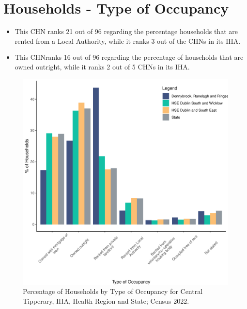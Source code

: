 \documentclass{article}
\begin{document}
\section{Households - Type of Occupancy}\label{sect:Households}
\begin{itemize}
\item This CHN ranks  21 out of 96 regarding the percentage households that are rented from a Local Authority, while it ranks  3 out of the CHNs in its IHA. 
\item This CHNranks  16 out of 96 regarding the percentage of households that are owned outright, while it ranks   2 out of 5 CHNs in its IHA.
\end{itemize}
\begin{figure}[H]
	\centering
	\includegraphics[width = 140mm]{../figures/HouseholdsED.pdf}
	\caption{Percentage of Households by Type of Occupancy for Central Tipperary, IHA, Health Region and State; Census 2022.}
	\label{fig:vbnv}
	\end{figure}
\end{document}
